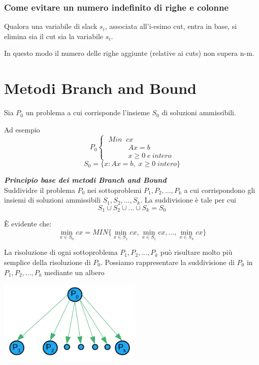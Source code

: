 \subsubsection{Come evitare un numero indefinito di righe e colonne}
Qualora una variabile di slack $s_{i}$, associata all'i-esimo cut, entra in base, si elimina sia il cut sia la variabile $s_{i}$.

In questo modo il numero delle righe aggiunte (relative ai cuts) non supera n-m.

\section{Metodi Branch and Bound}
Sia $P_{0}$ un problema a cui corrisponde l'insieme $S_{0}$ di soluzioni ammissibili.

Ad esempio
\begin{displaymath}
P_{0}
\begin{cases}
\;Min\;\;cx\\
\;\;\;\;\;\;\;\;\;\;\;A x = b\\
\;\;\;\;\;\;\;\;\;\;\;x \ge 0\;e\:intero
\end{cases}
\end{displaymath}
\begin{equation}
	S_{0}=\{x:Ax=b,\;x\ge 0\;intero\}
\end{equation}

\noindent
\emph{\textbf{Principio base dei metodi Branch and Bound}}
\\
Suddividre il problema $P_{0}$ nei sottoproblemi $P_{1},P_{2},...,P_{k}$ a cui corrispondono gli insiemi di soluzioni ammissibili $S_{1},S_{2},...,S_{k}$. La suddivisione è tale per cui 
\begin{equation}
S_{1} \cup S_{2} \cup ... \cup S_{k} = S_{0}
\end{equation}

È evidente che:
\begin{equation}
\min_{x \in S_{0}} cx = MIN\{\min_{x\in S_{1}} cx, \min_{x\in S_{1}}cx,...,\min_{x\in S_{k}}cx\}
\end{equation}

La risoluzione di ogni sottoproblema $P_{1},P_{2},...,P_{k}$ può risultare molto più semplice della risoluzione di $P_{0}$.
\newpage
Possiamo rappresentare la suddivisione di $P_{0}$ in $P_{1},P_{2},...,P_{k}$ mediante un albero

\centerline{\includegraphics[height=4cm]{images/graph14.png}}

